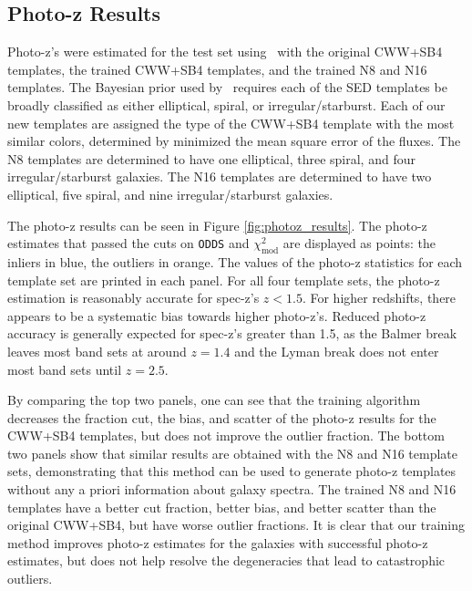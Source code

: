 \subsection{Photo-z Results}
\label{sect:photoz_results}

Photo-z's were estimated for the test set using \bpz\ with the original CWW+SB4 templates, the trained CWW+SB4 templates, and the trained N8 and N16 templates.
The Bayesian prior used by \bpz\ requires each of the SED templates be broadly classified as either elliptical, spiral, or irregular/starburst.
Each of our new templates are assigned the type of the CWW+SB4 template with the most similar colors, determined by minimized the mean square error of the fluxes.
The N8 templates are determined to have one elliptical, three spiral, and four irregular/starburst galaxies.
The N16 templates are determined to have two elliptical, five spiral, and nine irregular/starburst galaxies.

The photo-z results can be seen in Figure \ref{fig:photoz_results}.
The photo-z estimates that passed the cuts on \texttt{ODDS} and $\chi_\text{mod}^2$ are displayed as points: the inliers in blue, the outliers in orange.
The values of the photo-z statistics for each template set are printed in each panel.
For all four template sets, the photo-z estimation is reasonably accurate for spec-z's $z < 1.5$.
For higher redshifts, there appears to be a systematic bias towards higher photo-z's.
Reduced photo-z accuracy is generally expected for spec-z's greater than 1.5, as the Balmer break leaves most band sets at around $z=1.4$ and the Lyman break does not enter most band sets until $z=2.5$.

By comparing the top two panels, one can see that the training algorithm decreases the fraction cut, the bias, and scatter of the photo-z results for the CWW+SB4 templates, but does not improve the outlier fraction.
The bottom two panels show that similar results are obtained with the N8 and N16 template sets, demonstrating that this method can be used to generate photo-z templates without any a priori information about galaxy spectra.
The trained N8 and N16 templates have a better cut fraction, better bias, and better scatter than the original CWW+SB4, but have worse outlier fractions.
It is clear that our training method improves photo-z estimates for the galaxies with successful photo-z estimates, but does not help resolve the degeneracies that lead to catastrophic outliers.

